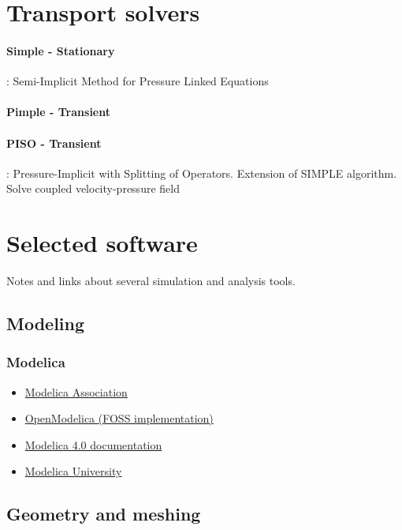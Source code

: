 \section{Transport solvers}

\paragraph{Simple - Stationary}: Semi-Implicit Method for Pressure Linked Equations

\paragraph{Pimple - Transient}

\paragraph{PISO - Transient}: Pressure-Implicit with Splitting of Operators. Extension of SIMPLE algorithm. Solve coupled velocity-pressure field

\section{Selected software}

Notes and links about several simulation and analysis tools.

\subsection{Modeling}

\subsubsection{Modelica}

\begin{itemize}
	\item\href{https://modelica.org/index.html}
	{Modelica Association}
	\item\href{https://www.openmodelica.org/}
	{OpenModelica (FOSS implementation)}
	\item\href{https://doc.modelica.org/Modelica%204.0.0/Resources/helpDymola/Modelica.html}
	{Modelica 4.0 documentation}
	\item\href{https://mbe.modelica.university/}
	{Modelica University}
\end{itemize}

\subsection{Geometry and meshing}


